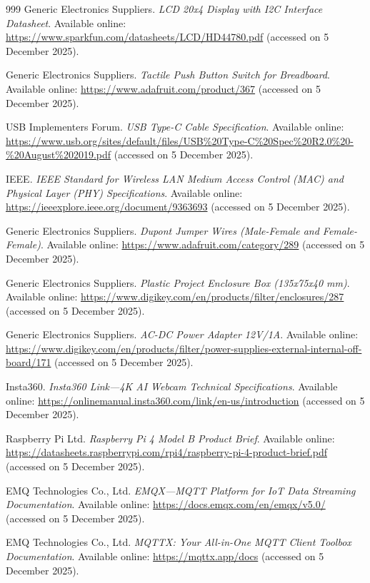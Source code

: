 \documentclass[journal,article,submit,pdftex]{Definitions/mdpi}
\begin{document}
\begin{thebibliography}{999}
Generic Electronics Suppliers.
\textit{LCD 20x4 Display with I2C Interface Datasheet}.
Available online: \url{https://www.sparkfun.com/datasheets/LCD/HD44780.pdf} (accessed on 5 December 2025).

Generic Electronics Suppliers.
\textit{Tactile Push Button Switch for Breadboard}.
Available online: \url{https://www.adafruit.com/product/367} (accessed on 5 December 2025).

USB Implementers Forum.
\textit{USB Type-C Cable Specification}.
Available online: \url{https://www.usb.org/sites/default/files/USB\%20Type-C\%20Spec\%20R2.0\%20-\%20August\%202019.pdf} (accessed on 5 December 2025).

IEEE.
\textit{IEEE Standard for Wireless LAN Medium Access Control (MAC) and Physical Layer (PHY) Specifications}.
Available online: \url{https://ieeexplore.ieee.org/document/9363693} (accessed on 5 December 2025).

Generic Electronics Suppliers.
\textit{Dupont Jumper Wires (Male-Female and Female-Female)}.
Available online: \url{https://www.adafruit.com/category/289} (accessed on 5 December 2025).

Generic Electronics Suppliers.
\textit{Plastic Project Enclosure Box (135x75x40 mm)}.
Available online: \url{https://www.digikey.com/en/products/filter/enclosures/287} (accessed on 5 December 2025).

Generic Electronics Suppliers.
\textit{AC-DC Power Adapter 12V/1A}.
Available online: \url{https://www.digikey.com/en/products/filter/power-supplies-external-internal-off-board/171} (accessed on 5 December 2025).

Insta360.
\textit{Insta360 Link---4K AI Webcam Technical Specifications}.
Available online: \url{https://onlinemanual.insta360.com/link/en-us/introduction} (accessed on 5 December 2025).

Raspberry Pi Ltd.
\textit{Raspberry Pi 4 Model B Product Brief}.
Available online: \url{https://datasheets.raspberrypi.com/rpi4/raspberry-pi-4-product-brief.pdf} (accessed on 5 December 2025).

EMQ Technologies Co., Ltd.
\textit{EMQX---MQTT Platform for IoT Data Streaming Documentation}.
Available online: \url{https://docs.emqx.com/en/emqx/v5.0/} (accessed on 5 December 2025).

EMQ Technologies Co., Ltd.
\textit{MQTTX: Your All-in-One MQTT Client Toolbox Documentation}.
Available online: \url{https://mqttx.app/docs} (accessed on 5 December 2025).


\end{thebibliography}
\end{document}
